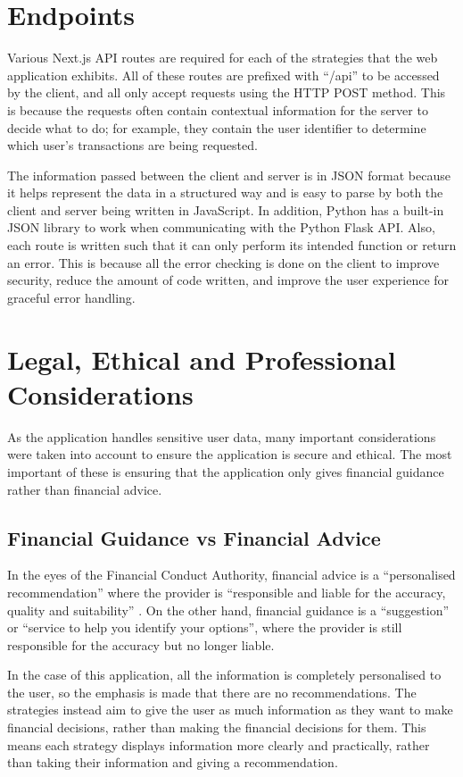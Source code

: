\newpage
\section{Endpoints}
\label{sec:endpoints}
Various Next.js API routes are required for each of the strategies that the web application exhibits. All of these routes are prefixed with ``/api'' to be accessed by the client, and all only accept requests using the HTTP POST method. This is because the requests often contain contextual information for the server to decide what to do; for example, they contain the user identifier to determine which user's transactions are being requested.

The information passed between the client and server is in JSON format because it helps represent the data in a structured way and is easy to parse by both the client and server being written in JavaScript. In addition, Python has a built-in JSON library to work when communicating with the Python Flask API. Also, each route is written such that it can only perform its intended function or return an error. This is because all the error checking is done on the client to improve security, reduce the amount of code written, and improve the user experience for graceful error handling.

\section{Legal, Ethical and Professional Considerations}
As the application handles sensitive user data, many important considerations were taken into account to ensure the application is secure and ethical. The most important of these is ensuring that the application only gives financial guidance rather than financial advice.

\subsection{Financial Guidance vs Financial Advice}
In the eyes of the Financial Conduct Authority, financial advice is a ``personalised recommendation'' where the provider is ``responsible and liable for the accuracy, quality and suitability'' \cite{FCA}. On the other hand, financial guidance is a ``suggestion'' or ``service to help you identify your options'', where the provider is still responsible for the accuracy but no longer liable.

In the case of this application, all the information is completely personalised to the user, so the emphasis is made that there are no recommendations. The strategies instead aim to give the user as much information as they want to make financial decisions, rather than making the financial decisions for them. This means each strategy displays information more clearly and practically, rather than taking their information and giving a recommendation.

